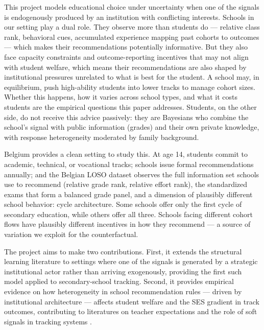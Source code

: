 \documentclass{article}
\begin{document}
This project models educational choice under uncertainty when one of the signals 
is endogenously produced by an institution with conflicting interests. Schools 
in our setting play a dual role. They observe more than students do --- relative 
class rank, behavioral cues, accumulated experience mapping past cohorts to 
outcomes --- which makes their recommendations potentially informative. But 
they also face capacity constraints and outcome-reporting incentives that may 
not align with student welfare, which means their recommendations are also 
shaped by institutional pressures unrelated to what is best for the student. 
A school may, in equilibrium, push high-ability students into lower tracks 
to manage cohort sizes. Whether this happens, how it varies across school 
types, and what it costs students are the empirical questions this paper 
addresses. Students, on the other side, do not receive this advice passively: 
they are Bayesians who combine the school's signal with public information 
(grades) and their own private knowledge, with response heterogeneity moderated 
by family background.

Belgium provides a clean setting to study this. At age 14, students commit to 
academic, technical, or vocational tracks; schools issue formal recommendations 
annually; and the Belgian LOSO dataset \citep{de_groote_dynamic_2025} observes 
the full information set schools use to recommend (relative grade rank, relative 
effort rank), the standardized exams that form a balanced grade panel, and a 
dimension of plausibly different school behavior: cycle architecture. Some 
schools offer only the first cycle of secondary education, while others offer 
all three. Schools facing different cohort flows have plausibly different 
incentives in how they recommend --- a source of variation we exploit for the 
counterfactual.

The project aims to make two contributions. First, it extends the structural 
learning literature \citep{stinebrickner2012learning, arcidiacono2025college, 
larroucau2024dynamic, bunting2024heterogeneity} to settings where one of the 
signals is generated by a strategic institutional actor rather than arriving 
exogenously, providing the first such model applied to secondary-school 
tracking. Second, it provides empirical evidence on how 
heterogeneity in school recommendation rules --- driven by institutional 
architecture --- affects student welfare and the SES gradient in track 
outcomes, contributing to literatures on teacher expectations and the role of soft signals in tracking systems \citep{piopiunik2015teacher, carlana_implicit_2019, brunello2025teacher}.
\end{document}
